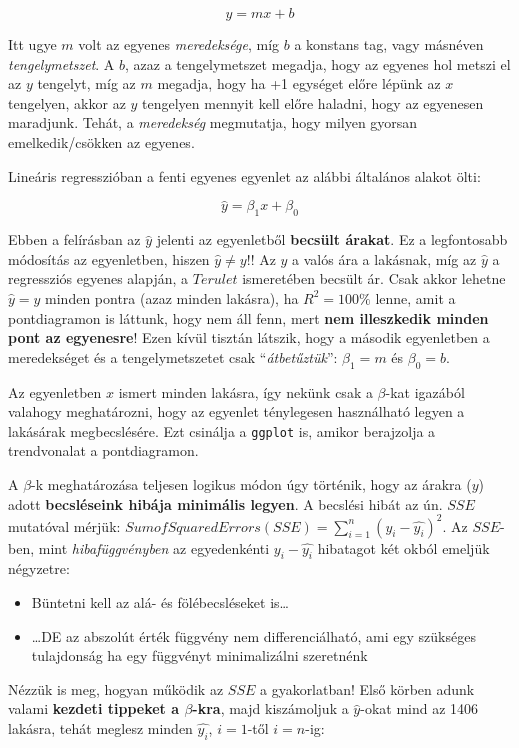 \documentclass[
]{book}
\providecommand{\tightlist}{%
  \setlength{\itemsep}{0pt}\setlength{\parskip}{0pt}}
\begin{document}
\[y=mx+b\]

Itt ugye \(m\) volt az egyenes \emph{meredeksége}, míg \(b\) a konstans tag, vagy másnéven \emph{tengelymetszet}. A \(b\), azaz a tengelymetszet megadja, hogy az egyenes hol metszi el az \(y\) tengelyt, míg az \(m\) megadja, hogy ha +1 egységet előre lépünk az \(x\) tengelyen, akkor az \(y\) tengelyen mennyit kell előre haladni, hogy az egyenesen maradjunk. Tehát, a \emph{meredekség} megmutatja, hogy milyen gyorsan emelkedik/csökken az egyenes.

Lineáris regresszióban a fenti egyenes egyenlet az alábbi általános alakot ölti:

\[\hat{y}=\beta_1x+\beta_0\]

Ebben a felírásban az \(\hat{y}\) jelenti az egyenletből \textbf{becsült árakat}. Ez a legfontosabb módosítás az egyenletben, hiszen \(\hat{y} \neq y\)!! Az \(y\) a valós ára a lakásnak, míg az \(\hat{y}\) a regressziós egyenes alapján, a \(Terulet\) ismeretében becsült ár. Csak akkor lehetne \(\hat{y} = y\) minden pontra (azaz minden lakásra), ha \(R^2=100\%\) lenne, amit a pontdiagramon is láttunk, hogy nem áll fenn, mert \textbf{nem illeszkedik minden pont az egyenesre}! Ezen kívül tisztán látszik, hogy a második egyenletben a meredekséget és a tengelymetszetet csak ``\emph{átbetűztük}'': \(\beta_1=m\) és \(\beta_0=b\).

Az egyenletben \(x\) ismert minden lakásra, így nekünk csak a \(\beta\)-kat igazából valahogy meghatározni, hogy az egyenlet ténylegesen használható legyen a lakásárak megbecslésére. Ezt csinálja a \texttt{ggplot} is, amikor berajzolja a trendvonalat a pontdiagramon.

A \(\beta\)-k meghatározása teljesen logikus módon úgy történik, hogy az árakra (\(y\)) adott \textbf{becsléseink hibája minimális legyen}. A becslési hibát az ún. \(SSE\) mutatóval mérjük: \(Sum of Squared Errors (SSE) = \sum_{i=1}^n(y_i-\hat{y_i})^2\).
Az \(SSE\)-ben, mint \emph{hibafüggvényben} az egyedenkénti \(y_i-\hat{y_i}\) hibatagot két okból emeljük négyzetre:

\begin{itemize}
\tightlist
\item
  Büntetni kell az alá- és fölébecsléseket is\ldots{}
\item
  \ldots DE az abszolút érték függvény nem differenciálható, ami egy szükséges tulajdonság ha egy függvényt minimalizálni szeretnénk
\end{itemize}

Nézzük is meg, hogyan működik az \(SSE\) a gyakorlatban! Első körben adunk valami \textbf{kezdeti tippeket a \(\beta\)-kra}, majd kiszámoljuk a \(\hat{y}\)-okat mind az 1406 lakásra, tehát meglesz minden \(\hat{y_i}\), \(i=1\)-től \(i=n\)-ig:
\end{document}
